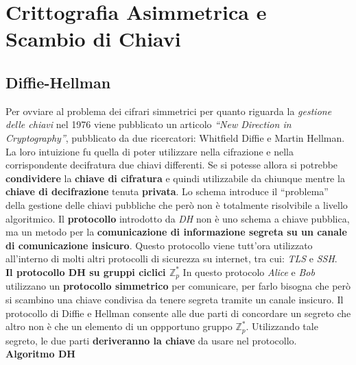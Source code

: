 \chapter{Crittografia Asimmetrica e Scambio di Chiavi}

\section{Diffie-Hellman}
Per ovviare al problema dei cifrari simmetrici per quanto riguarda la \textit{gestione delle chiavi} nel 1976 viene pubblicato un articolo \textit{``New Direction in Cryptography''}, pubblicato da due ricercatori: Whitfield Diffie e Martin Hellman. La loro intuizione fu quella di poter utilizzare nella cifrazione e nella corrispondente decifratura due chiavi differenti. Se si potesse allora si potrebbe \textbf{condividere} la \textbf{chiave di cifratura} e quindi utilizzabile da chiunque mentre la \textbf{chiave di decifrazione} tenuta \textbf{privata}. Lo schema introduce il ``problema'' della gestione delle chiavi pubbliche che però non è totalmente risolvibile a livello algoritmico.
\newline
Il \textbf{protocollo} introdotto da \textit{DH} non è uno schema a chiave pubblica, ma un metodo per la \textbf{comunicazione di informazione segreta su un canale di comunicazione insicuro}. Questo protocollo viene tutt'ora utilizzato all'interno di molti altri protocolli di sicurezza su internet, tra cui: \textit{TLS} e \textit{SSH}.
\\ \newline
\textbf{Il protocollo DH su gruppi ciclici $\mathbb{Z}_p^*$}
\newline
In questo protocolo \textit{Alice} e \textit{Bob} utilizzano un \textbf{protocollo simmetrico} per comunicare, per farlo bisogna che però si scambino una chiave condivisa da tenere segreta tramite un canale insicuro. Il protocollo di Diffie e Hellman consente alle due parti di concordare un segreto che altro non è che un elemento di un oppportuno gruppo $\mathbb{Z}_p^*$. Utilizzando tale segreto, le due parti \textbf{deriveranno la chiave} da usare nel protocollo.
\\ \newline
\textbf{Algoritmo DH}
